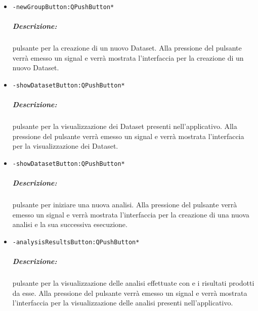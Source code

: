 \begin{itemize}
\item\color{teal}\verb!-newGroupButton:QPushButton*!
\color{black}
\subparagraph{Descrizione: }pulsante per la creazione di un nuovo Dataset\g{}. Alla pressione del pulsante verrà emesso un signal\g{} e verrà mostrata l'interfaccia per la creazione di un nuovo Dataset\g{}.

\item\color{teal}\verb!-showDatasetButton:QPushButton*!
\color{black}
\subparagraph{Descrizione: }pulsante per la visualizzazione dei Dataset\g{} presenti nell'applicativo. Alla pressione del pulsante verrà emesso un signal\g{} e verrà mostrata l'interfaccia per la visualizzazione dei Dataset\g{}.

\item\color{teal}\verb!-showDatasetButton:QPushButton*!
\color{black}
\subparagraph{Descrizione: }pulsante per iniziare una nuova analisi. Alla pressione del pulsante verrà emesso un signal\g{} e verrà mostrata l'interfaccia per la creazione di una nuova analisi e la sua successiva esecuzione.

\item\color{teal}\verb!-analysisResultsButton:QPushButton*!
\color{black}
\subparagraph{Descrizione: }pulsante per la visualizzazione delle analisi effettuate con \project{} e i risultati prodotti da esse. Alla pressione del pulsante verrà emesso un signal\g{} e verrà mostrata l'interfaccia per la visualizzazione delle analisi presenti nell'applicativo.
\end{itemize}
